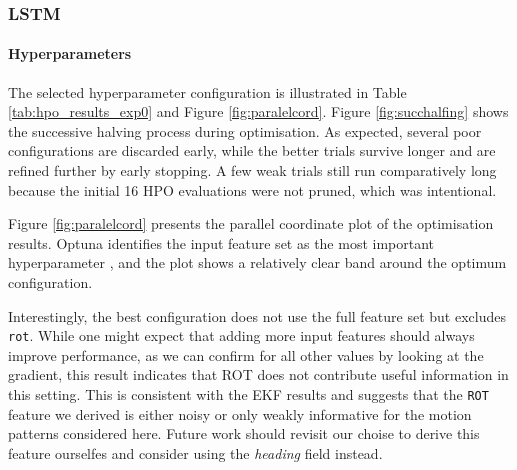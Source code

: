  

                \subsubsection{LSTM}
                
                    \paragraph{Hyperparameters}
                    The selected hyperparameter configuration is illustrated in Table \ref{tab:hpo_results_exp0} and Figure \ref{fig:paralelcord}. Figure \ref{fig:succhalfing} shows the successive halving process during optimisation. As expected, several poor configurations are discarded early, while the better trials survive longer and are refined further by early stopping. A few weak trials still run comparatively long because the initial 16 \ac{HPO} evaluations were not pruned, which was intentional.
                    
                    Figure \ref{fig:paralelcord} presents the parallel coordinate plot of the optimisation results. Optuna identifies the input feature set as the most important hyperparameter%
                    , and the plot shows a relatively clear band around the optimum configuration.
                    
                    Interestingly, the best configuration does not use the full feature set but excludes \texttt{rot}. While one might expect that adding more input features should always improve performance, as we can confirm for all other values by looking at the gradient, this result indicates that \ac{ROT} does not contribute useful information in this setting. This is consistent with the \ac{EKF} results and suggests that the \texttt{\ac{ROT}} feature we derived is either noisy or only weakly informative for the motion patterns considered here. Future work should revisit our choise to derive this feature ourselfes and consider using the \textit{heading} field instead. %
                    
